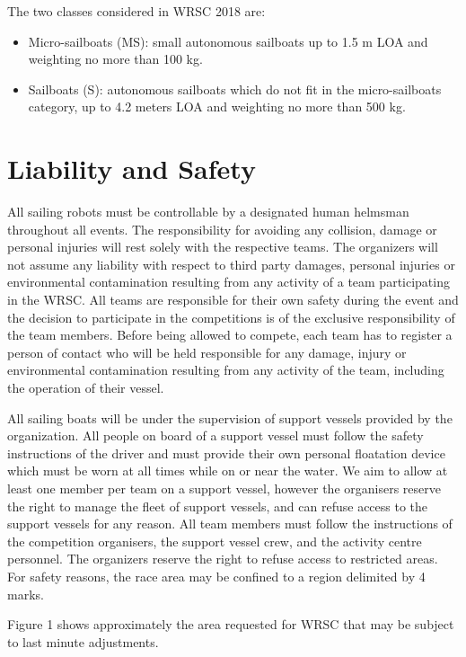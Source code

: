 \documentclass[12pt]{article}
\begin{document}
The two classes considered in WRSC 2018 are:
\begin{itemize}
  \item Micro-sailboats (MS): small autonomous sailboats up to 1.5 m LOA and weighting no more than 100 kg.
  \item Sailboats (S): autonomous sailboats which do not fit in the micro-sailboats category, up to
4.2 meters LOA and weighting no more than 500 kg.
\end{itemize}

\section{Liability and Safety}
All sailing robots must be controllable by a designated human helmsman
throughout all events. The responsibility for avoiding any collision, 
damage or personal injuries will rest solely with the respective teams. 
The organizers will not assume any liability with respect to third party
damages, personal injuries or environmental contamination resulting from any
activity of a team participating in the WRSC. All teams are responsible for 
their own safety during the event and the decision to participate in the 
competitions is of the exclusive responsibility of the team members.
Before being allowed to compete, each team has to register a person of contact
who will be held responsible for any damage, injury or environmental
contamination resulting from any activity of the team, including the 
operation of their vessel.

All sailing boats will be under the supervision of support vessels provided by the
organization.
All people on board of a support vessel must follow the safety instructions of the driver 
and must provide their own personal floatation device which must be worn at all times 
while on or near the water. We aim to allow at least one member per team on a support vessel, 
however the organisers reserve the
right to manage the fleet of support vessels, and can refuse access to the support
vessels for any reason.
All team members must follow the instructions of the competition
organisers, the support vessel crew, and the activity centre personnel. The organizers
reserve the right to refuse access to restricted areas.
For safety reasons, the race area may be confined to a region delimited by 4
marks. 

Figure 1
shows approximately the area requested for WRSC that may be subject to last
minute adjustments.
\end{document}
